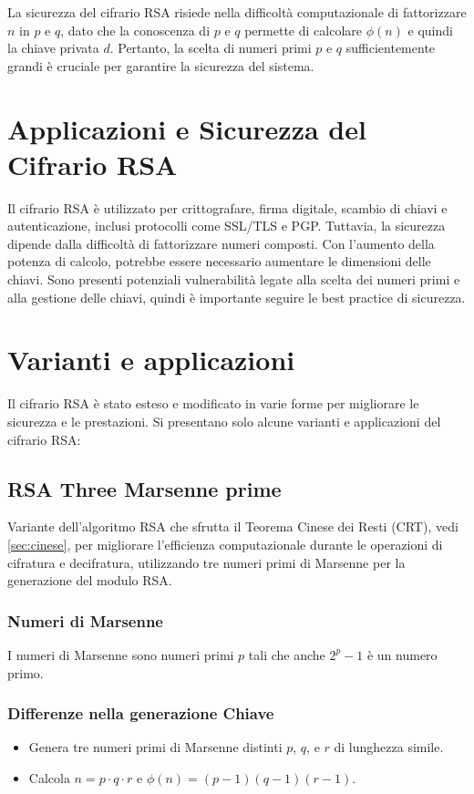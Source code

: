 \documentclass[a4paper,12pt]{report}
\begin{document}
La sicurezza del cifrario RSA risiede nella difficoltà computazionale di fattorizzare $n$ in $p$ e $q$, dato che la conoscenza di $p$ e $q$ permette di calcolare $\phi(n)$ e quindi la chiave privata $d$. Pertanto, la scelta di numeri primi $p$ e $q$ sufficientemente grandi è cruciale per garantire la sicurezza del sistema.

\section{Applicazioni e Sicurezza del Cifrario RSA}

Il cifrario RSA è utilizzato per crittografare, firma digitale, scambio di chiavi e autenticazione, inclusi protocolli come SSL/TLS e PGP. Tuttavia, la sicurezza dipende dalla difficoltà di fattorizzare numeri composti. Con l'aumento della potenza di calcolo, potrebbe essere necessario aumentare le dimensioni delle chiavi. Sono presenti potenziali vulnerabilità legate alla scelta dei numeri primi e alla gestione delle chiavi, quindi è importante seguire le best practice di sicurezza.

\section{Varianti e applicazioni}
Il cifrario RSA è stato esteso e modificato in varie forme per migliorare le sicurezza e le prestazioni. Si presentano solo alcune varianti e applicazioni del cifrario RSA:

\subsection{RSA Three Marsenne prime} \cite{padmaja2016}
Variante dell'algoritmo RSA che sfrutta il Teorema Cinese dei Resti (CRT), vedi \ref{sec:cinese}, per migliorare l'efficienza computazionale durante le operazioni di cifratura e decifratura, utilizzando tre numeri primi di Marsenne per la generazione del modulo RSA.

\subsubsection*{Numeri di Marsenne}
I numeri di Marsenne sono numeri primi \(p\) tali che anche \(2^p - 1\) è un numero primo. 

\subsubsection*{Differenze nella generazione Chiave}
\begin{itemize}
    \item Genera tre numeri primi di Marsenne distinti $p$, $q$, e $r$ di lunghezza simile.
    \item Calcola $n = p \cdot q \cdot r$ e $\phi(n) = (p-1)(q-1)(r-1)$.
\end{itemize}
\end{document}
